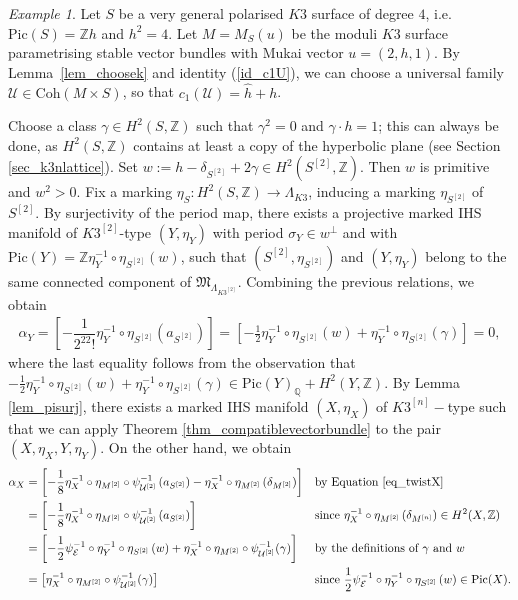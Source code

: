 \documentclass[12pt,a4paper]{amsart}
\theoremstyle{plain}
\theoremstyle{definition}
\theoremstyle{remark}
\newtheorem{example}[thm]{Example}
\def\Pic{\mathrm{Pic}}
\def\Coh{\mathrm{Coh}}
\def\Z{\mathbb{Z}}
\def\QQ{\mathbb{Q}}
\newcommand{\rathodge}[1]{\psi_{#1}}
\newcommand{\nn}{{[n]}}
\begin{document}
\begin{example}\label{ex_nonfinemoduli}
Let $S$ be a very general polarised $K3$ surface of degree $4$, i.e. $\Pic(S)=\Z h$ and $h^2=4$. Let $M=M_S(u)$ be the moduli $K3$ surface parametrising stable vector bundles with Mukai vector $u=(2,h,1)$. By Lemma~\ref{lem_choosek} and identity (\ref{id_c1U}), we can choose a universal family $\mathcal{U}\in\Coh(M\times S)$, so that $c_1(\mathcal{U})=\widehat{h}+h$.

Choose a class $\gamma\in H^2(S,\Z)$ such that $\gamma^2=0$ and $\gamma\cdot h=1$; this can always be done, as $H^2(S,\Z)$ contains at least a copy of the hyperbolic plane (see Section \ref{sec_k3nlattice}). Set $w:=h-\delta_{S^{[2]}}+2\gamma\in H^2(S^{[2]},\Z)$.
Then $w$ is primitive and $w^2>0$. Fix a marking $\eta_S\colon H^2(S,\mathbb{Z})\rightarrow\Lambda_{K3}$, inducing a marking $\eta_{S^{[2]}}$ of $S^{[2]}$. 
By surjectivity of the period map, there exists a projective marked IHS manifold of $K3^{[2]}$-type $(Y,\eta_Y)$ with period $\sigma_Y\in w^\perp$ and with $\Pic(Y)=\mathbb{Z}\eta_Y^{-1}\circ\eta_{S^{[2]}}(w)$, such that $(S^{[2]},\eta_{S^{[2]}})$ and $(Y, \eta_Y)$ belong to the same connected component of $\mathfrak{M}_{\Lambda_{K3^{[2]}}}$. Combining the previous relations, we obtain
\begin{align*}
    \alpha_Y=\left[-\dfrac{1}{2^22!}\eta_Y^{-1}\circ\eta_{S^{[2]}}(a_{S^{[2]}})\right]=\left[-\frac{1}{2}\eta_Y^{-1}\circ\eta_{S^{[2]}}\left(w\right)+\eta_Y^{-1}\circ\eta_{S^{[2]}}\left(\gamma\right)\right]=0,
\end{align*}
where the last equality follows from the observation that $-\frac{1}{2}\eta_Y^{-1}\circ\eta_{S^{[2]}}\left(w\right)+\eta_Y^{-1}\circ\eta_{S^{[2]}}\left(\gamma\right)\in\Pic(Y)_{\QQ}+H^2(Y,\mathbb{Z})$.
By Lemma \ref{lem_pisurj}, there exists a marked IHS manifold $(X,\eta_X)$ of $K3^\nn-$type such that we can apply Theorem \ref{thm_compatiblevectorbundle} to the pair $(X,\eta_X,Y,\eta_Y)$.
On the other hand, we obtain 
\begin{align*}
\alpha_X
&= \left[-\frac{1}{8}\eta_X^{-1}\circ\eta_{M^{[2]}}\circ\rathodge{\mathcal{U}^{[2]}}^{-1}\left(a_{S^{[2]}}\right)-\eta_X^{-1}\circ\eta_{M^{[2]}}\left(\delta_{M^{[2]}}\right)\right] 
&& \text{by Equation~\eqref{eq_twistX}} \\
&= \left[-\frac{1}{8}\eta_X^{-1}\circ\eta_{M^{[2]}}\circ\rathodge{\mathcal{U}^{[2]}}^{-1}\left(a_{S^{[2]}}\right)\right]
&& \text{since } \eta_X^{-1}\circ\eta_{M^{[2]}}\left(\delta_{M^{[n]}}\right)\in H^2(X,\Z) \\
&= \left[-\frac{1}{2}\rathodge{\mathcal{E}}^{-1}\circ\eta_Y^{-1}\circ\eta_{S^{[2]}}\left(w\right)+\eta_X^{-1}\circ\eta_{M^{[2]}}\circ\rathodge{\mathcal{U}^{[2]}}^{-1}(\gamma)\right]
&& \text{by the definitions of $\gamma$ and $w$} \\
&= \left[\eta_X^{-1}\circ\eta_{M^{[2]}}\circ\rathodge{\mathcal{U}^{[2]}}^{-1}(\gamma)\right]
&& \text{since }\frac{1}{2}\rathodge{\mathcal{E}}^{-1}\circ\eta_Y^{-1}\circ\eta_{S^{[2]}}\left(w\right)\in\Pic(X).
\end{align*}


\end{example}
\end{document}
